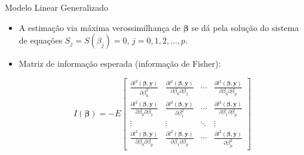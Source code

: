 \documentclass[10pt, aspectratio=169]{beamer}
\begin{document}


\begin{frame}{Modelo Linear Generalizado} 

\begin{itemize}


\item A estimação via máxima verossimilhança de $\boldsymbol{\beta}$ se dá pela solução do sistema de equações $S_j=S(\beta_j)=0$, $j=0,1,2,...,p$.

  \vspace{0,5cm}  


\item Matriz de informação esperada (informação de Fisher):

$$
I(\boldsymbol{\beta})=-E
\begin{bmatrix}
\frac{\partial l^{2}(\boldsymbol{\beta , y})}{\partial \beta_{0}^{2}  } &
\frac{\partial l^{2}(\boldsymbol{\beta , y})}{\partial \beta_{0} \partial \beta_{1}  } &
\cdots  &  
\frac{\partial l^{2}(\boldsymbol{\beta , y})}{\partial \beta_{0} \partial \beta_{p}  }\\ 
\frac{\partial l^{2}(\boldsymbol{\beta , y})}{\partial \beta_{0} \partial \beta_{1}  } &  
\frac{\partial l^{2}(\boldsymbol{\beta , y})}{\partial \beta_{1}^{2}  } &
\cdots  &
\frac{\partial l^{2}(\boldsymbol{\beta , y})}{\partial \beta_{1} \partial \beta_{p}  }
 \\ 
\vdots & \vdots & \ddots & \vdots \\ 
\frac{\partial l^{2}(\boldsymbol{\beta , y})}{\partial \beta_{0} \partial \beta_{p}  } &
\frac{\partial l^{2}(\boldsymbol{\beta , y})}{\partial \beta_{1} \partial \beta_{p}  }  &
\cdots  & 
\frac{\partial l^{2}(\boldsymbol{\beta , y})}{\partial \beta_{p}^{2}  }
\end{bmatrix}
$$

\end{itemize}
\end{frame}



\end{document}
